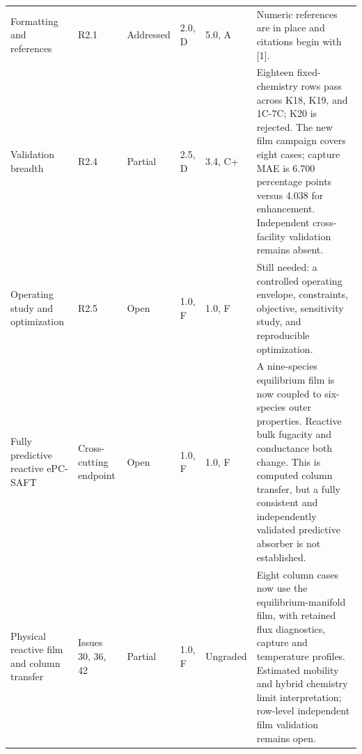 \documentclass[10pt,landscape,letterpaper]{article}
\newcommand{\status}[2]{\textcolor{#1}{#2}}
\begin{document}
\begin{tabularx}{\linewidth}{@{}P{1.45in}P{0.84in}P{0.76in}P{0.46in}P{0.56in}Y@{}}
Formatting and references & R2.1 & \status{green!50!black}{Addressed} & 2.0, D & 5.0, A & Numeric references are in place and citations begin with [1].\\[2pt]
Validation breadth & R2.4 & \status{partial}{Partial} & 2.5, D & 3.4, C+ & Eighteen fixed-chemistry rows pass across K18, K19, and 1C-7C; K20 is rejected. The new film campaign covers eight cases; capture MAE is 6.700 percentage points versus 4.038 for enhancement. Independent cross-facility validation remains absent.\\[2pt]
Operating study and optimization & R2.5 & \status{open}{Open} & 1.0, F & 1.0, F & Still needed: a controlled operating envelope, constraints, objective, sensitivity study, and reproducible optimization.\\[2pt]
Fully predictive reactive ePC-SAFT & Cross-cutting endpoint & \status{open}{Open} & 1.0, F & 1.0, F & A nine-species equilibrium film is now coupled to six-species outer properties. Reactive bulk fugacity and conductance both change. This is computed column transfer, but a fully consistent and independently validated predictive absorber is not established.\\[2pt]
Physical reactive film and column transfer & Issues 30, 36, 42 & \status{partial}{Partial} & 1.0, F & Ungraded & Eight column cases now use the equilibrium-manifold film, with retained flux diagnostics, capture and temperature profiles. Estimated mobility and hybrid chemistry limit interpretation; row-level independent film validation remains open.\\
\bottomrule
\end{tabularx}
\end{document}
